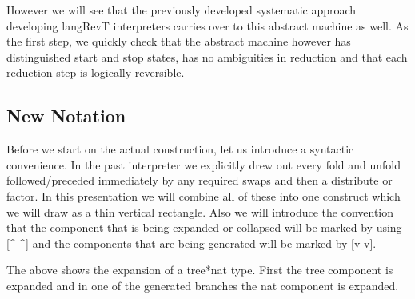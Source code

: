 \documentclass{llncs}
\begin{document}
{%

However we will see that the previously developed systematic approach
developing {{langRevT}} interpreters carries over to this abstract
machine as well.  As the first step, we quickly check that the
abstract machine however has distinguished start and stop states, has
no ambiguities in reduction and that each reduction step is logically
reversible.

\subsection{New Notation}

Before we start on the actual construction, let us introduce a
syntactic convenience. In the past interpreter we explicitly drew out
every {{fold}} and {{unfold}} followed/preceded immediately by any
required swaps and then a {{distribute}} or {{factor}}. In this
presentation we will combine all of these into one construct which we
will draw as a thin vertical rectangle. Also we will introduce the
convention that the component that is being expanded or collapsed will
be marked by using {{[^ ^]}} and the components that are being
generated will be marked by {{[v v]}}. 

\begin{center}
\end{center}

The above shows the expansion of a {{tree*nat}} type. First the
{{tree}} component is expanded and in one of the generated branches
the {{nat}} component is expanded.

}
\end{document}
